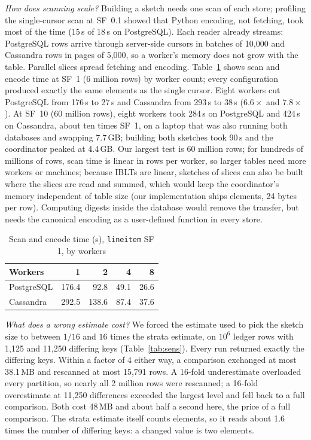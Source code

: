 \documentclass[conference]{IEEEtran}
\begin{document}
\emph{How does scanning scale?} Building a sketch needs one scan of each store; profiling the single-cursor scan at SF~0.1 showed that Python encoding, not fetching, took most of the time (15\,s of 18\,s on PostgreSQL). Each reader already streams: PostgreSQL rows arrive through server-side cursors in batches of 10{,}000 and Cassandra rows in pages of 5{,}000, so a worker's memory does not grow with the table. Parallel slices spread fetching and encoding. Table~\ref{tab:scan} shows scan and encode time at SF~1 (6 million rows) by worker count; every configuration produced exactly the same elements as the single cursor. Eight workers cut PostgreSQL from 176\,s to 27\,s and Cassandra from 293\,s to 38\,s ($6.6\times$ and $7.8\times$). At SF~10 (60 million rows), eight workers took 284\,s on PostgreSQL and 424\,s on Cassandra, about ten times SF~1, on a laptop that was also running both databases and swapping 7.7\,GB; building both sketches took 90\,s and the coordinator peaked at 4.4\,GB. Our largest test is 60 million rows; for hundreds of millions of rows, scan time is linear in rows per worker, so larger tables need more workers or machines; because IBLTs are linear, sketches of slices can also be built where the slices are read and summed, which would keep the coordinator's memory independent of table size (our implementation ships elements, 24 bytes per row). Computing digests inside the database would remove the transfer, but needs the canonical encoding as a user-defined function in every store.

\begin{table}[t]
\caption{Scan and encode time (s), \texttt{lineitem} SF 1, by workers}
\label{tab:scan}
\centering\footnotesize
\begin{tabular}{@{}lrrrr@{}}
\toprule
Workers & 1 & 2 & 4 & 8\\
\midrule
PostgreSQL & 176.4 & 92.8 & 49.1 & 26.6\\
Cassandra & 292.5 & 138.6 & 87.4 & 37.6\\
\bottomrule
\end{tabular}
\end{table}

\emph{What does a wrong estimate cost?} We forced the estimate used to pick the sketch size to between $1/16$ and $16$ times the strata estimate, on $10^6$ ledger rows with 1{,}125 and 11{,}250 differing keys (Table~\ref{tab:sens}). Every run returned exactly the differing keys. Within a factor of 4 either way, a comparison exchanged at most 38.1\,MB and rescanned at most 15{,}791 rows. A 16-fold underestimate overloaded every partition, so nearly all 2 million rows were rescanned; a 16-fold overestimate at 11{,}250 differences exceeded the largest level and fell back to a full comparison. Both cost 48\,MB and about half a second here, the price of a full comparison. The strata estimate itself counts elements, so it reads about 1.6 times the number of differing keys: a changed value is two elements.
\end{document}

